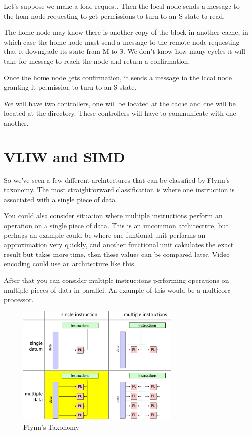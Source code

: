 \documentclass{article}
\begin{document}
Let's suppose we make a load request. Then the local node sends a message to the hom node requesting to get permissions to turn to an S state to read. 

The home node may know there is another copy of the block in another cache, in which case the home node must send a message to the remote node requesting that it downgrade its state from M to S. We don't know how many cycles it will take for message to reach the node and return a confirmation. 

Once the home node gets confirmation, it sends a message to the local node granting it permission to turn to an S state. 

We will have two controllers, one will be located at the cache and one will be located at the directory. These controllers will have to communicate with one another. 

\section{VLIW and SIMD}

So we've seen a few different architectures that can be classified by Flynn's taxonomy. The most straightforward classification is where one instruction is associated with a single piece of data. 

You could also consider situation where multiple instructions perform an operation on a single piece of data. This is an uncommon architecture, but perhaps an example could be where one funtional unit performs an approximation very quickly, and another functional unit calculates the exact result but takes more time, then these values can be compared later. Video encoding could use an architecture like this. 

After that you can consider multiple instructions performing operations on multiple  pieces of data in parallel. An example of this would be a multicore processor. 

 \begin{figure}[ht!]
\centering
\includegraphics[width=80mm]{img/flynn.png}
\caption{Flynn's Taxonomy}
\end{figure}
\end{document}
